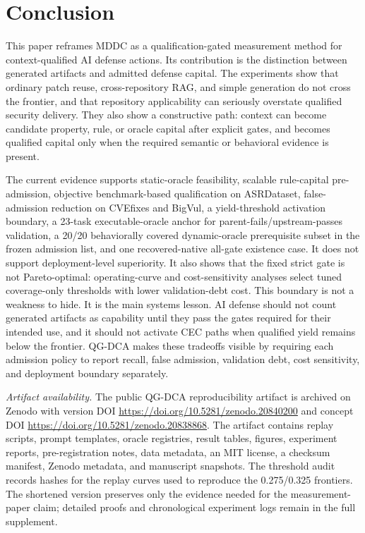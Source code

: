 ﻿\documentclass[lettersize,journal]{IEEEtran}
\begin{document}
\section{Conclusion}
This paper reframes MDDC as a qualification-gated measurement method for context-qualified AI defense actions. Its contribution is the distinction between generated artifacts and admitted defense capital. The experiments show that ordinary patch reuse, cross-repository RAG, and simple generation do not cross the frontier, and that repository applicability can seriously overstate qualified security delivery. They also show a constructive path: context can become candidate property, rule, or oracle capital after explicit gates, and becomes qualified capital only when the required semantic or behavioral evidence is present.

The current evidence supports static-oracle feasibility, scalable rule-capital pre-admission, objective benchmark-based qualification on ASRDataset, false-admission reduction on CVEfixes and BigVul, a yield-threshold activation boundary, a 23-task executable-oracle anchor for parent-fails/upstream-passes validation, a 20/20 behaviorally covered dynamic-oracle prerequisite subset in the frozen admission list, and one recovered-native all-gate existence case. It does not support deployment-level superiority. It also shows that the fixed strict gate is not Pareto-optimal: operating-curve and cost-sensitivity analyses select tuned coverage-only thresholds with lower validation-debt cost. This boundary is not a weakness to hide. It is the main systems lesson. AI defense should not count generated artifacts as capability until they pass the gates required for their intended use, and it should not activate CEC paths when qualified yield remains below the frontier. QG-DCA makes these tradeoffs visible by requiring each admission policy to report recall, false admission, validation debt, cost sensitivity, and deployment boundary separately.

\textit{Artifact availability.} The public QG-DCA reproducibility artifact is archived on Zenodo with version DOI \url{https://doi.org/10.5281/zenodo.20840200} and concept DOI \url{https://doi.org/10.5281/zenodo.20838868}. The artifact contains replay scripts, prompt templates, oracle registries, result tables, figures, experiment reports, pre-registration notes, data metadata, an MIT license, a checksum manifest, Zenodo metadata, and manuscript snapshots. The threshold audit records hashes for the replay curves used to reproduce the 0.275/0.325 frontiers. The shortened version preserves only the evidence needed for the measurement-paper claim; detailed proofs and chronological experiment logs remain in the full supplement.
\end{document}
